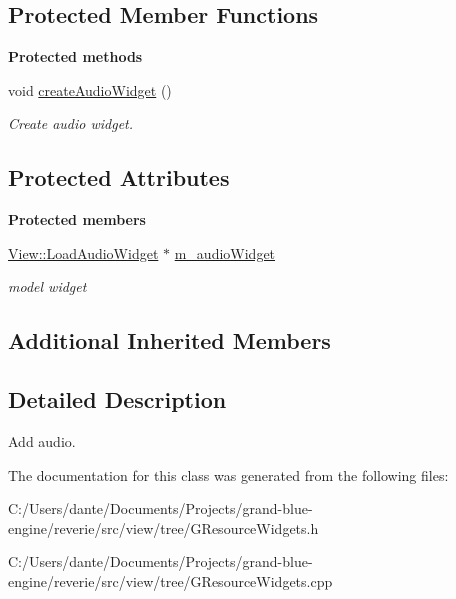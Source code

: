 \subsection*{Protected Member Functions}
\begin{Indent}\textbf{ Protected methods}\par
\begin{DoxyCompactItemize}
\item 
\mbox{\label{classrev_1_1_load_audio_command_a1e4ee2573ad2361f97ce09498be1539b}} 
void \mbox{\hyperlink{classrev_1_1_load_audio_command_a1e4ee2573ad2361f97ce09498be1539b}{create\+Audio\+Widget}} ()
\begin{DoxyCompactList}\small\item\em Create audio widget. \end{DoxyCompactList}\end{DoxyCompactItemize}
\end{Indent}
\subsection*{Protected Attributes}
\begin{Indent}\textbf{ Protected members}\par
\begin{DoxyCompactItemize}
\item 
\mbox{\label{classrev_1_1_load_audio_command_a9e558842d801ac9187e39023d9c258c3}} 
\mbox{\hyperlink{classrev_1_1_view_1_1_load_audio_widget}{View\+::\+Load\+Audio\+Widget}} $\ast$ \mbox{\hyperlink{classrev_1_1_load_audio_command_a9e558842d801ac9187e39023d9c258c3}{m\+\_\+audio\+Widget}}
\begin{DoxyCompactList}\small\item\em model widget \end{DoxyCompactList}\end{DoxyCompactItemize}
\end{Indent}
\subsection*{Additional Inherited Members}


\subsection{Detailed Description}
Add audio. 

The documentation for this class was generated from the following files\+:\begin{DoxyCompactItemize}
\item 
C\+:/\+Users/dante/\+Documents/\+Projects/grand-\/blue-\/engine/reverie/src/view/tree/G\+Resource\+Widgets.\+h\item 
C\+:/\+Users/dante/\+Documents/\+Projects/grand-\/blue-\/engine/reverie/src/view/tree/G\+Resource\+Widgets.\+cpp\end{DoxyCompactItemize}
